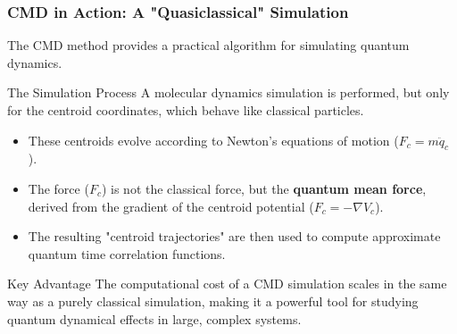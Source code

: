 \begin{frame}
  \frametitle{CMD in Action: A "Quasiclassical" Simulation}
  
  The CMD method provides a practical algorithm for simulating quantum dynamics. \pause
  
  \begin{block}{The Simulation Process}
    A molecular dynamics simulation is performed, but only for the centroid coordinates, which behave like classical particles.
  \end{block} \pause
  
  \begin{itemize}
    \item These centroids evolve according to Newton's equations of motion ($F_c = m \ddot{q}_c$). \pause
    
    \item The force ($F_c$) is not the classical force, but the \textbf{quantum mean force}, derived from the gradient of the centroid potential ($F_c = -\nabla V_c$). \pause
    
    \item The resulting "centroid trajectories" are then used to compute approximate quantum time correlation functions. \pause
  \end{itemize}
  
  \begin{alertblock}{Key Advantage}
    The computational cost of a CMD simulation scales in the same way as a purely classical simulation, making it a powerful tool for studying quantum dynamical effects in large, complex systems.
  \end{alertblock}
\end{frame}